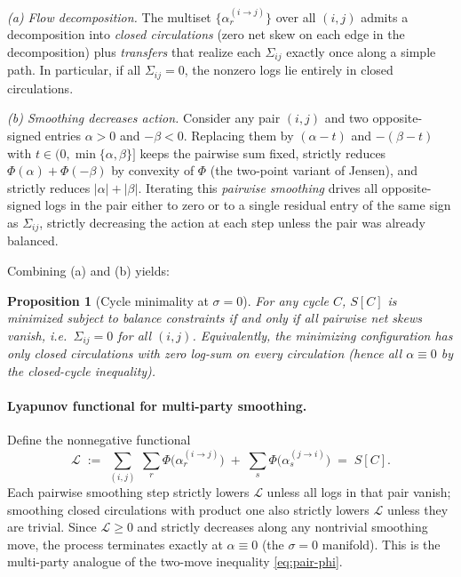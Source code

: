 \documentclass[11pt]{article}
\newtheorem{proposition}[theorem]{Proposition}
\begin{document}
\emph{(a) Flow decomposition.} The multiset $\{\alpha^{(i\to j)}_r\}$ over all $(i,j)$ admits a decomposition into \emph{closed circulations} (zero net skew on each edge in the decomposition) plus \emph{transfers} that realize each $\Sigma_{ij}$ exactly once along a simple path. In particular, if all $\Sigma_{ij}=0$, the nonzero logs lie entirely in closed circulations.

\emph{(b) Smoothing decreases action.} Consider any pair $(i,j)$ and two opposite-signed entries $\alpha>0$ and $-\beta<0$. Replacing them by $(\alpha-t)$ and $-(\beta-t)$ with $t\in(0,\min\{\alpha,\beta\}]$ keeps the pairwise sum fixed, strictly reduces $\Phi(\alpha)+\Phi(-\beta)$ by convexity of $\Phi$ (the two-point variant of Jensen), and strictly reduces $|\alpha|+|\beta|$. Iterating this \emph{pairwise smoothing} drives all opposite-signed logs in the pair either to zero or to a single residual entry of the same sign as $\Sigma_{ij}$, strictly decreasing the action at each step unless the pair was already balanced.

Combining (a) and (b) yields:

\begin{proposition}[Cycle minimality at $\sigma=0$]
For any cycle $C$, $S[C]$ is minimized subject to balance constraints if and only if all pairwise net skews vanish, i.e.\ $\Sigma_{ij}=0$ for all $(i,j)$. Equivalently, the minimizing configuration has only closed circulations with zero log-sum on every circulation (hence all $\alpha\equiv 0$ by the closed-cycle inequality).
\end{proposition}

\paragraph{Lyapunov functional for multi-party smoothing.}
Define the nonnegative functional
\[
\mathcal{L}\;:=\;\sum_{(i,j)}\ \sum_{r}\Phi\!\big(\alpha^{(i\to j)}_r\big)\;+\;\sum_{s}\Phi\!\big(\alpha^{(j\to i)}_s\big)
\;=\;S[C].
\]
Each pairwise smoothing step strictly lowers $\mathcal{L}$ unless all logs in that pair vanish; smoothing closed circulations with product one also strictly lowers $\mathcal{L}$ unless they are trivial. Since $\mathcal{L}\ge 0$ and strictly decreases along any nontrivial smoothing move, the process terminates exactly at $\alpha\equiv 0$ (the $\sigma=0$ manifold). This is the multi-party analogue of the two-move inequality \eqref{eq:pair-phi}.
\end{document}
